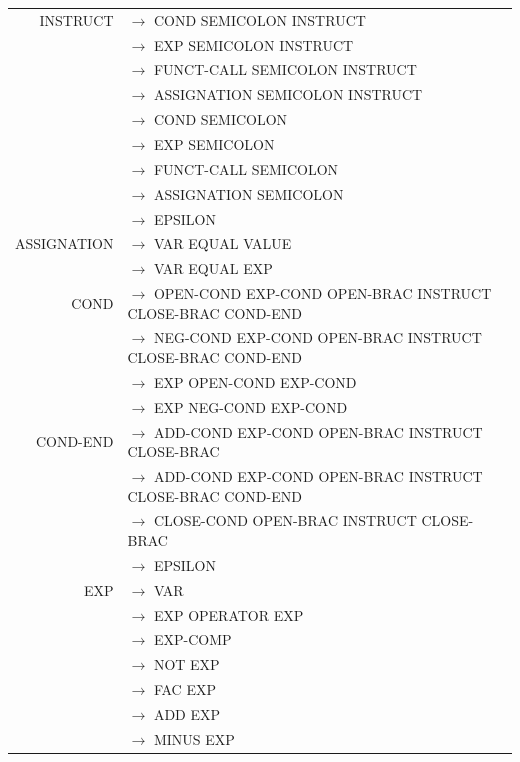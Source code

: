 \documentclass[a4paper,10pt]{article}
\begin{document}
\hspace{-4.5cm}\begin{tabular}{rl}


INSTRUCT			& $\rightarrow$ COND SEMICOLON INSTRUCT\\
					& $\rightarrow$ EXP SEMICOLON INSTRUCT\\
					& $\rightarrow$ FUNCT-CALL SEMICOLON INSTRUCT\\
					& $\rightarrow$ ASSIGNATION SEMICOLON INSTRUCT\\
					& $\rightarrow$ COND SEMICOLON \\
					& $\rightarrow$ EXP SEMICOLON \\
					& $\rightarrow$ FUNCT-CALL SEMICOLON \\
					& $\rightarrow$ ASSIGNATION SEMICOLON \\
					& $\rightarrow$ EPSILON \\
					

ASSIGNATION			& $\rightarrow$ VAR EQUAL VALUE \\
					& $\rightarrow$ VAR EQUAL EXP \\
					
COND				& $\rightarrow$ OPEN-COND EXP-COND OPEN-BRAC INSTRUCT CLOSE-BRAC COND-END\\
					& $\rightarrow$ NEG-COND EXP-COND OPEN-BRAC INSTRUCT CLOSE-BRAC COND-END\\
					& $\rightarrow$ EXP OPEN-COND EXP-COND \\
					& $\rightarrow$ EXP NEG-COND EXP-COND \\


COND-END			& $\rightarrow$ ADD-COND EXP-COND OPEN-BRAC INSTRUCT CLOSE-BRAC \\
					& $\rightarrow$ ADD-COND EXP-COND OPEN-BRAC INSTRUCT CLOSE-BRAC COND-END \\
					& $\rightarrow$ CLOSE-COND OPEN-BRAC INSTRUCT CLOSE-BRAC\\
					& $\rightarrow$ EPSILON \\					

EXP					& $\rightarrow$ VAR   \\
					& $\rightarrow$ EXP OPERATOR EXP \\ 
					& $\rightarrow$ EXP-COMP \\
					& $\rightarrow$ NOT EXP \\
					& $\rightarrow$ FAC EXP \\
					& $\rightarrow$ ADD EXP \\
					& $\rightarrow$ MINUS EXP \\
					

\end{tabular}
\end{document}

